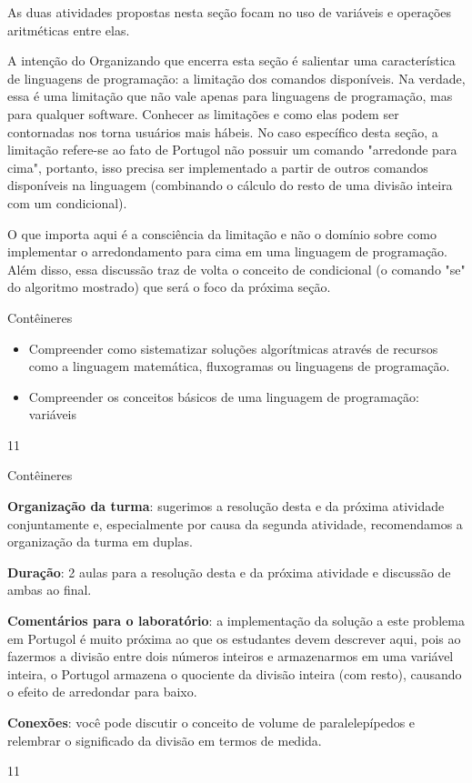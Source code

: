 \label{comp_exp3}
\begin{texto}
{
As duas atividades propostas nesta seção focam no uso de variáveis e operações aritméticas entre elas.

A intenção do Organizando que encerra esta seção é salientar uma característica de linguagens de programação: a limitação dos comandos disponíveis. Na verdade, essa é uma limitação que não vale apenas para linguagens de programação, mas para qualquer software. Conhecer as limitações e como elas podem ser contornadas nos torna usuários mais hábeis. No caso específico desta seção, a limitação refere-se ao fato de Portugol não possuir um comando "arredonde para cima", portanto, isso precisa ser implementado a partir de outros comandos disponíveis na linguagem (combinando o cálculo do resto de uma divisão inteira com um condicional).

O que importa aqui é a consciência da limitação e não o domínio sobre como implementar o arredondamento para cima em uma linguagem de programação. Além disso, essa discussão traz de volta o conceito de condicional (o comando "se"{} do algoritmo mostrado) que será o foco da próxima seção.
}
\end{texto}
\begin{objectives}{Contêineres}
{
\begin{itemize}
\item Compreender como sistematizar soluções algorítmicas através de recursos como a linguagem matemática, fluxogramas ou linguagens de programação.

\item Compreender os conceitos básicos de uma linguagem de programação: variáveis
\end{itemize}
}{1}{1}
\end{objectives}
\begin{sugestions}{Contêineres}
{
\textbf{Organização da turma}: sugerimos a resolução desta e da próxima atividade conjuntamente e, especialmente por causa da segunda atividade, recomendamos a organização da turma em duplas.

\textbf{Duração}: 2 aulas para a resolução desta e da próxima atividade e discussão de ambas ao final.

\textbf{Comentários para o laboratório}: a implementação da solução a este problema em Portugol é muito próxima ao que os estudantes devem descrever aqui, pois ao fazermos a divisão entre dois números inteiros e armazenarmos em uma variável inteira, o Portugol armazena o quociente da divisão inteira (com resto), causando o efeito de arredondar para baixo.

\textbf{Conexões}: você pode discutir o conceito de volume de paralelepípedos e relembrar o significado da divisão em termos de medida.
}{1}{1}
\end{sugestions}
